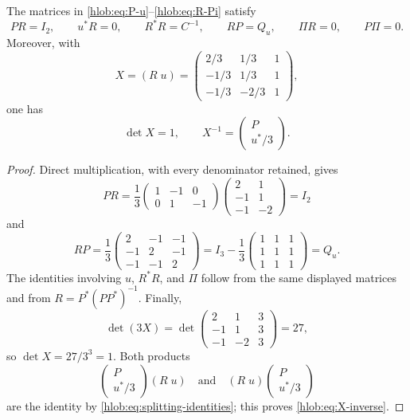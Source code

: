 \begin{lemma}
\label{hlob:lem:splitting-identities}
The matrices in \eqref{hlob:eq:P-u}--\eqref{hlob:eq:R-Pi} satisfy
\begin{equation}
 PR=I_2,\qquad u^*R=0,\qquad R^*R=C^{-1},\qquad
 RP=Q_u,\qquad \Pi R=0,\qquad P\Pi=0.
 \label{hlob:eq:splitting-identities}
\end{equation}
Moreover, with
\begin{equation}
 X=(R\;u)
 =\begin{pmatrix}
  2/3& 1/3&1\\
 -1/3& 1/3&1\\
 -1/3&-2/3&1
 \end{pmatrix},
 \label{hlob:eq:X}
\end{equation}
one has
\begin{equation}
 \det X=1,\qquad
 X^{-1}=\begin{pmatrix}P\\u^*/3\end{pmatrix}.
 \label{hlob:eq:X-inverse}
\end{equation}
\end{lemma}

\begin{proof}
Direct multiplication, with every denominator retained, gives
\[
 PR
 =\frac13
 \begin{pmatrix}1&-1&0\\0&1&-1\end{pmatrix}
 \begin{pmatrix}2&1\\-1&1\\-1&-2\end{pmatrix}
 =I_2
\]
and
\[
 RP
 =\frac13
 \begin{pmatrix}
  2&-1&-1\\
 -1& 2&-1\\
 -1&-1& 2
 \end{pmatrix}
 =I_3-\frac13
 \begin{pmatrix}1&1&1\\1&1&1\\1&1&1\end{pmatrix}
 =Q_u.
\]
The identities involving \(u\), \(R^*R\), and \(\Pi\) follow from the same
displayed matrices and from \(R=P^*(PP^*)^{-1}\).  Finally,
\[
 \det(3X)
 =\det\begin{pmatrix}2&1&3\\-1&1&3\\-1&-2&3\end{pmatrix}
 =27,
\]
so \(\det X=27/3^3=1\).  Both products
\[
 \begin{pmatrix}P\\u^*/3\end{pmatrix}(R\;u)
 \quad\text{and}\quad
 (R\;u)\begin{pmatrix}P\\u^*/3\end{pmatrix}
\]
are the identity by \eqref{hlob:eq:splitting-identities}; this proves
\eqref{hlob:eq:X-inverse}.
\end{proof}

